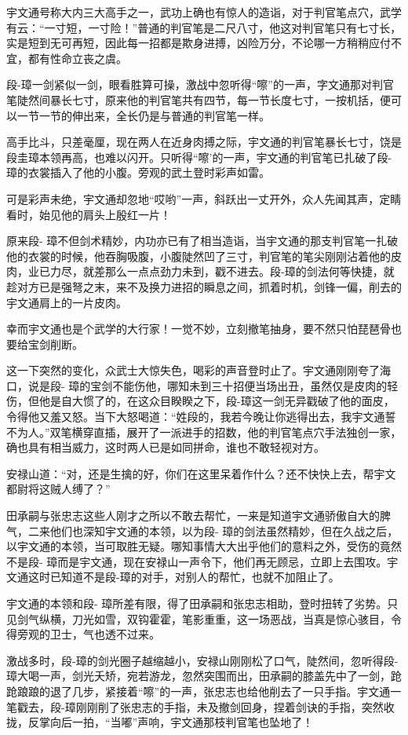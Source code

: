 \documentclass[12pt,oneside]{book}
\begin{document}
宇文通号称大内三大高手之一，武功上确也有惊人的造诣，对于判官笔点穴，武学有云：``一寸短，一寸险！''普通的判官笔是二尺八寸，他这对判官笔只有七寸长，实是短到无可再短，因此每一招都是欺身进搏，凶险万分，不论哪一方稍稍应付不宜，都有性命立丧之虞。

段-璋一剑紧似一剑，眼看胜算可操，激战中忽听得``嚓''的一声，字文通那对判官笔陡然间暴长七寸，原来他的判官笔共有四节，每一节长度七寸，一按机括，便可以一节一节的伸出来，全长仍是与普通的判官笔一样。

高手比斗，只差毫厘，现在两人在近身肉搏之际，宇文通的判官笔暴长七寸，饶是段圭璋本领再高，也难以闪开。只听得``嚓'的一声，宇文通的判官笔已扎破了段-
璋的衣裳插入了他的小腹。旁观的武土登时彩声如雷。

可是彩声未绝，宇文通却忽地``哎哟''一声，斜跃出一丈开外，众人先闻其声，定睛看时，始见他的肩头上殷红一片！

原来段-
璋不但剑术精妙，内功亦已有了相当造诣，当宇文通的那支判官笔一扎破他的衣裳的时候，他吞胸吸腹，小腹陡然凹了三寸，判官笔的笔尖刚刚沾着他的皮肉，业已力尽，就差那么一点点劲力未到，戳不进去。段-璋的剑法何等快捷，就趁对方已是强弩之末，来不及换力进招的瞬息之间，抓着时机，剑锋一偏，削去的宇文通肩上的一片皮肉。

幸而宇文通也是个武学的大行家！一觉不妙，立刻撤笔抽身，要不然只怕琵琶骨也要给宝剑削断。

这一下突然的变化，众武士大惊失色，喝彩的声音登时止了。宇文通刚刚夸了海口，说是段-
璋的宝剑不能伤他，哪知未到三十招便当场出丑，虽然仅是皮肉的轻伤，但他是自大惯了的，在这众目睽睽之下，段-璋这一剑无异戳破了他的面皮，令得他又羞又怒。当下大怒喝道：``姓段的，我若今晚让你逃得出去，我宇文通誓不为人。''双笔横穿直插，展开了一派进手的招数，他的判官笔点穴手法独创一家，确也具有相当威力，这时两人已是如同拼命，谁也不敢轻视对方。

安禄山道：``对，还是生擒的好，你们在这里呆着作什么？还不快快上去，帮宇文都尉将这贼人缚了？''

田承嗣与张忠志这些人刚才之所以不敢去帮忙，一来是知道宇文通骄傲自大的脾气，二来他们也深知宇文通的本领，以为段-
璋的剑法虽然精妙，但在久战之后，以宇文通的本领，当可取胜无疑。哪知事情大大出乎他们的意料之外，受伤的竟然不是段-
璋而是宇文通，现在安禄山一声令下，他们再无顾忌，立即上去围攻。宇文通这时已知道不是段-璋的对手，对别人的帮忙，也就不加阻止了。

宇文通的本领和段-
璋所差有限，得了田承嗣和张忠志相助，登时扭转了劣势。只见剑气纵横，刀光如雪，双钩霍霍，笔影重重，这一场恶战，当真是惊心骇目，令得旁观的卫士，气也透不过来。

激战多时，段-璋的剑光圈子越缩越小，安禄山刚刚松了口气，陡然间，忽听得段-
璋大喝一声，剑光夭矫，宛若游龙，忽然突围而出，田承嗣的膝盖先中了一剑，跄跄踉踉的退了几步，紧接着``嚓''的一声，张忠志也给他削去了一只手指。宇文通一笔戳去，段-璋刚刚削了张忠志的手指，未及撤剑回身，捏着剑诀的手指，突然收拢，反掌向后一拍，``当嘟''声响，宇文通那枝判官笔也坠地了！
\end{document}
